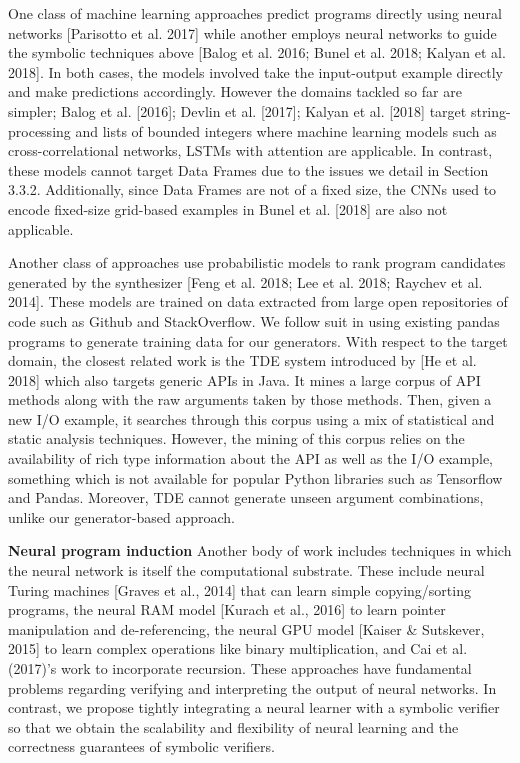 \documentclass{article}
\begin{document}
One class of machine learning approaches predict programs directly using neural networks [Parisotto et al. 2017] while another employs neural networks to guide the symbolic techniques above [Balog et al. 2016; Bunel et al. 2018; Kalyan et al. 2018]. In both cases, the models involved take the input-output example directly and make predictions accordingly. However the domains tackled so far are simpler; Balog et al. [2016]; Devlin et al. [2017]; Kalyan et al. [2018] target string-processing and lists of bounded integers where machine learning models such as cross-correlational networks, LSTMs with attention are applicable. In contrast, these models cannot target Data Frames due to the issues we detail in Section 3.3.2. Additionally, since Data Frames are not of a fixed size, the CNNs used to encode fixed-size grid-based examples in Bunel et al. [2018] are also not applicable.

Another class of approaches use probabilistic models to rank program candidates generated by the synthesizer [Feng et al. 2018; Lee et al. 2018; Raychev et al. 2014]. These models are trained on data extracted from large open repositories of code such as Github and StackOverflow. We follow suit in using existing pandas programs to generate training data for our generators. With respect to the target domain, the closest related work is the TDE system introduced by [He et al. 2018] which also targets generic APIs in Java. It mines a large corpus of API methods along with the raw arguments taken by those methods. Then, given a new I/O example, it searches through this corpus using a mix of statistical and static analysis techniques. However, the mining of this corpus relies on the availability of rich type information about the API as well as the I/O example, something which is not available for popular Python libraries such as Tensorflow and Pandas. Moreover, TDE cannot generate unseen argument combinations, unlike our generator-based approach.

\textbf{Neural program induction}
Another body of work includes techniques in which the neural network is itself the computational substrate. These include neural Turing machines [Graves et al., 2014] that can learn simple copying/sorting programs, the neural RAM model [Kurach et al., 2016] to learn pointer manipulation and de-referencing, the neural GPU model [Kaiser \& Sutskever, 2015] to learn complex operations like binary multiplication, and Cai et al. (2017)’s work to incorporate recursion. These approaches have fundamental problems regarding verifying and interpreting the output of neural networks. In contrast, we propose tightly integrating a neural learner with a symbolic verifier so that we obtain the scalability and flexibility of neural learning and the correctness guarantees of symbolic verifiers.
\end{document}
